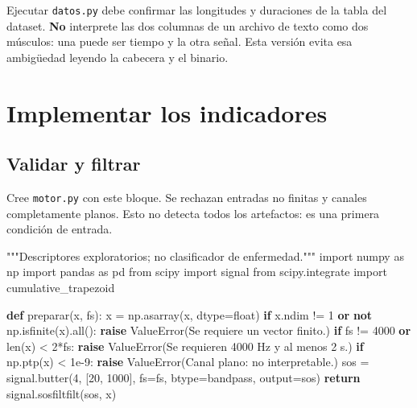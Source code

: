 \documentclass[
  spanish,
  10.5pt,
  a4paper,
  DIV=11,
  numbers=noendperiod]{scrartcl}
\newenvironment{Shaded}{\begin{snugshade}}{\end{snugshade}}
\newcommand{\BuiltInTok}[1]{\textcolor[rgb]{0.00,0.23,0.31}{#1}}
\newcommand{\CommentTok}[1]{\textcolor[rgb]{0.37,0.37,0.37}{#1}}
\newcommand{\ControlFlowTok}[1]{\textcolor[rgb]{0.00,0.23,0.31}{\textbf{#1}}}
\newcommand{\DecValTok}[1]{\textcolor[rgb]{0.68,0.00,0.00}{#1}}
\newcommand{\FloatTok}[1]{\textcolor[rgb]{0.68,0.00,0.00}{#1}}
\newcommand{\ImportTok}[1]{\textcolor[rgb]{0.00,0.46,0.62}{#1}}
\newcommand{\KeywordTok}[1]{\textcolor[rgb]{0.00,0.23,0.31}{\textbf{#1}}}
\newcommand{\NormalTok}[1]{\textcolor[rgb]{0.00,0.23,0.31}{#1}}
\newcommand{\OperatorTok}[1]{\textcolor[rgb]{0.37,0.37,0.37}{#1}}
\newcommand{\PreprocessorTok}[1]{\textcolor[rgb]{0.68,0.00,0.00}{#1}}
\newcommand{\StringTok}[1]{\textcolor[rgb]{0.13,0.47,0.30}{#1}}
\begin{document}
Ejecutar \texttt{datos.py} debe confirmar las longitudes y duraciones de
la tabla del dataset. \textbf{No} interprete las dos columnas de un
archivo de texto como dos músculos: una puede ser tiempo y la otra
señal. Esta versión evita esa ambigüedad leyendo la cabecera y el
binario.

\section{Implementar los indicadores}\label{implementar-los-indicadores}

\subsection{Validar y filtrar}\label{validar-y-filtrar}

Cree \texttt{motor.py} con este bloque. Se rechazan entradas no finitas
y canales completamente planos. Esto no detecta todos los artefactos: es
una primera condición de entrada.

\begin{Shaded}
\begin{Highlighting}[]
\CommentTok{"""Descriptores exploratorios; no clasificador de enfermedad."""}
\ImportTok{import}\NormalTok{ numpy }\ImportTok{as}\NormalTok{ np}
\ImportTok{import}\NormalTok{ pandas }\ImportTok{as}\NormalTok{ pd}
\ImportTok{from}\NormalTok{ scipy }\ImportTok{import}\NormalTok{ signal}
\ImportTok{from}\NormalTok{ scipy.integrate }\ImportTok{import}\NormalTok{ cumulative\_trapezoid}


\KeywordTok{def}\NormalTok{ preparar(x, fs):}
\NormalTok{    x }\OperatorTok{=}\NormalTok{ np.asarray(x, dtype}\OperatorTok{=}\BuiltInTok{float}\NormalTok{)}
    \ControlFlowTok{if}\NormalTok{ x.ndim }\OperatorTok{!=} \DecValTok{1} \KeywordTok{or} \KeywordTok{not}\NormalTok{ np.isfinite(x).}\BuiltInTok{all}\NormalTok{():}
        \ControlFlowTok{raise} \PreprocessorTok{ValueError}\NormalTok{(}\StringTok{\textquotesingle{}Se requiere un vector finito.\textquotesingle{}}\NormalTok{)}
    \ControlFlowTok{if}\NormalTok{ fs }\OperatorTok{!=} \DecValTok{4000} \KeywordTok{or} \BuiltInTok{len}\NormalTok{(x) }\OperatorTok{\textless{}} \DecValTok{2}\OperatorTok{*}\NormalTok{fs:}
        \ControlFlowTok{raise} \PreprocessorTok{ValueError}\NormalTok{(}\StringTok{\textquotesingle{}Se requieren 4000 Hz y al menos 2 s.\textquotesingle{}}\NormalTok{)}
    \ControlFlowTok{if}\NormalTok{ np.ptp(x) }\OperatorTok{\textless{}} \FloatTok{1e{-}9}\NormalTok{:}
        \ControlFlowTok{raise} \PreprocessorTok{ValueError}\NormalTok{(}\StringTok{\textquotesingle{}Canal plano: no interpretable.\textquotesingle{}}\NormalTok{)}
\NormalTok{    sos }\OperatorTok{=}\NormalTok{ signal.butter(}\DecValTok{4}\NormalTok{, [}\DecValTok{20}\NormalTok{, }\DecValTok{1000}\NormalTok{], fs}\OperatorTok{=}\NormalTok{fs,}
\NormalTok{                        btype}\OperatorTok{=}\StringTok{\textquotesingle{}bandpass\textquotesingle{}}\NormalTok{, output}\OperatorTok{=}\StringTok{\textquotesingle{}sos\textquotesingle{}}\NormalTok{)}
    \ControlFlowTok{return}\NormalTok{ signal.sosfiltfilt(sos, x)}
\end{Highlighting}
\end{Shaded}
\end{document}
